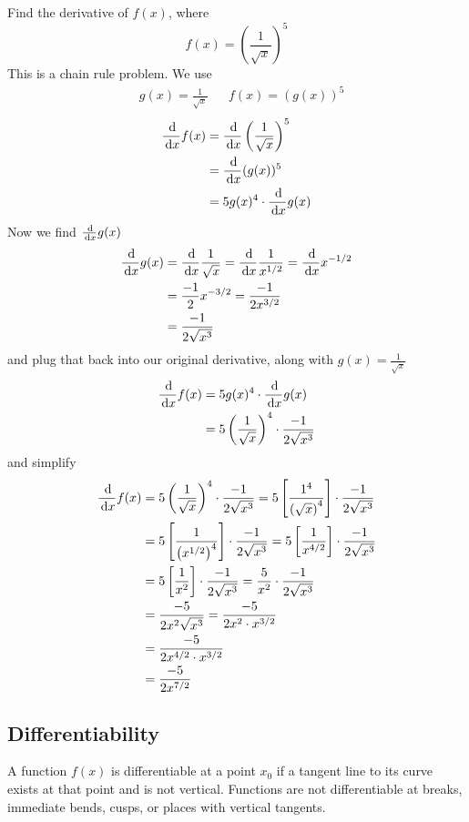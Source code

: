\begin{ex}
  Find the derivative of $f(x)$, where
  $$ f(x)=\left(\frac{1}{\sqrt{x}}\right)^5 $$
  This is a chain rule problem. We use
  \begin{align*}
    & g(x)=\frac{1}{\sqrt{x}}
    & & f(x)={(g(x))^5}
  \end{align*}
  \begin{align*}
    \frac{\,\mathrm{d}}{\,\mathrm{d} x} f(x)&=\frac{\,\mathrm{d}}{\,\mathrm{d} x} \left(\frac{1}{\sqrt{x}}\right)^5 \\
      &= \frac{\,\mathrm{d}}{\,\mathrm{d} x} {(g(x))^5} \\
      &= 5g(x)^4 \cdot \frac{\,\mathrm{d}}{\,\mathrm{d} x} g(x)
  \end{align*}
  Now we find $ \frac{\,\mathrm{d}}{\,\mathrm{d} x} g(x) $
  \begin{align*}
    \frac{\,\mathrm{d}}{\,\mathrm{d} x} g(x) &= \frac{\,\mathrm{d}}{\,\mathrm{d} x} \frac{1}{\sqrt{x}} =\frac{\,\mathrm{d}}{\,\mathrm{d} x} \frac{1}{x^{1/2}} =\frac{\,\mathrm{d}}{\,\mathrm{d} x} x^{-1/2} \\
      &=\frac{-1}{2}x^{-3/2} =\frac{-1}{2x^{3/2}} \\
      &=\frac{-1}{2\sqrt{x^3}}
  \end{align*}
  and plug that back into our original derivative, along with $g(x)=\frac{1}{\sqrt{x}}$
  \begin{align*}
    \frac{\,\mathrm{d}}{\,\mathrm{d} x} f(x)&=5g(x)^4 \cdot \frac{\,\mathrm{d}}{\,\mathrm{d} x} g(x) \\
      &=5\left(\frac{1}{\sqrt{x}}\right)^4\cdot \frac{-1}{2\sqrt{x^3}}
  \end{align*}
  and simplify
  \begin{align*}
    \frac{\,\mathrm{d}}{\,\mathrm{d} x} f(x)&=5\left(\frac{1}{\sqrt{x}}\right)^4\cdot \frac{-1}{2\sqrt{x^3}} =5\left[\frac{1^4}{\left(\sqrt{x}\right)^4}\right] \cdot \frac{-1}{2\sqrt{x^3}} \\
    &=5\left[\frac{1}{\left(x^{1/2}\right)^4}\right] \cdot \frac{-1}{2\sqrt{x^3}}=5\left[\frac{1}{x^{4/2}}\right] \cdot \frac{-1}{2\sqrt{x^3}} \\
    &=5\left[\frac{1}{x^2}\right] \cdot \frac{-1}{2\sqrt{x^3}}=\frac{5}{x^2} \cdot \frac{-1}{2\sqrt{x^3}} \\
    &=\frac{-5}{2x^2\sqrt{x^3}} =\frac{-5}{2x^2\cdot x^{3/2}} \\
    &=\frac{-5}{2x^{4/2}\cdot x^{3/2}}\\
    &=\frac{-5}{2x^{7/2}} \\
  \end{align*}
\end{ex}
\subsection{Differentiability}
  A function $f(x)$ is differentiable at a point $x_0$ if a tangent line to its curve exists at that point and is not vertical. Functions are not differentiable at breaks, immediate bends, cusps, or places with vertical tangents.

